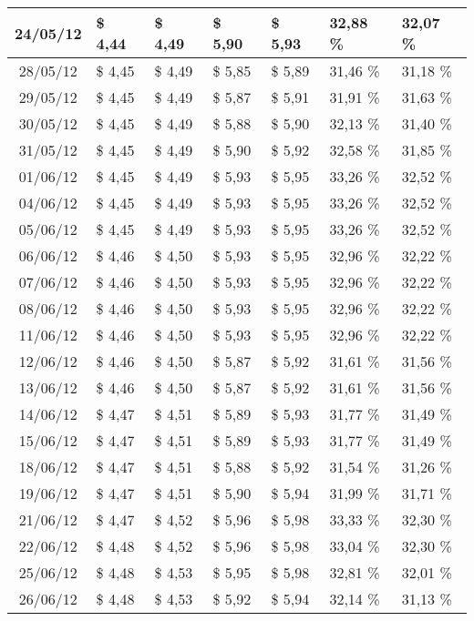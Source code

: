 \begin{center}
\begin{longtable}{|c|p{1.5cm}|p{1.5cm}|p{1.5cm}|p{1.5cm}|p{1.5cm}|p{1.5cm}|}
24/05/12 & \$ 4,44 & \$ 4,49 & \$ 5,90 & \$ 5,93 & 32,88 \% & 32,07 \% \\ \hline
28/05/12 & \$ 4,45 & \$ 4,49 & \$ 5,85 & \$ 5,89 & 31,46 \% & 31,18 \% \\ \hline
29/05/12 & \$ 4,45 & \$ 4,49 & \$ 5,87 & \$ 5,91 & 31,91 \% & 31,63 \% \\ \hline
30/05/12 & \$ 4,45 & \$ 4,49 & \$ 5,88 & \$ 5,90 & 32,13 \% & 31,40 \% \\ \hline
31/05/12 & \$ 4,45 & \$ 4,49 & \$ 5,90 & \$ 5,92 & 32,58 \% & 31,85 \% \\ \hline
01/06/12 & \$ 4,45 & \$ 4,49 & \$ 5,93 & \$ 5,95 & 33,26 \% & 32,52 \% \\ \hline
04/06/12 & \$ 4,45 & \$ 4,49 & \$ 5,93 & \$ 5,95 & 33,26 \% & 32,52 \% \\ \hline
05/06/12 & \$ 4,45 & \$ 4,49 & \$ 5,93 & \$ 5,95 & 33,26 \% & 32,52 \% \\ \hline
06/06/12 & \$ 4,46 & \$ 4,50 & \$ 5,93 & \$ 5,95 & 32,96 \% & 32,22 \% \\ \hline
07/06/12 & \$ 4,46 & \$ 4,50 & \$ 5,93 & \$ 5,95 & 32,96 \% & 32,22 \% \\ \hline
08/06/12 & \$ 4,46 & \$ 4,50 & \$ 5,93 & \$ 5,95 & 32,96 \% & 32,22 \% \\ \hline
11/06/12 & \$ 4,46 & \$ 4,50 & \$ 5,93 & \$ 5,95 & 32,96 \% & 32,22 \% \\ \hline
12/06/12 & \$ 4,46 & \$ 4,50 & \$ 5,87 & \$ 5,92 & 31,61 \% & 31,56 \% \\ \hline
13/06/12 & \$ 4,46 & \$ 4,50 & \$ 5,87 & \$ 5,92 & 31,61 \% & 31,56 \% \\ \hline
14/06/12 & \$ 4,47 & \$ 4,51 & \$ 5,89 & \$ 5,93 & 31,77 \% & 31,49 \% \\ \hline
15/06/12 & \$ 4,47 & \$ 4,51 & \$ 5,89 & \$ 5,93 & 31,77 \% & 31,49 \% \\ \hline
18/06/12 & \$ 4,47 & \$ 4,51 & \$ 5,88 & \$ 5,92 & 31,54 \% & 31,26 \% \\ \hline
19/06/12 & \$ 4,47 & \$ 4,51 & \$ 5,90 & \$ 5,94 & 31,99 \% & 31,71 \% \\ \hline
21/06/12 & \$ 4,47 & \$ 4,52 & \$ 5,96 & \$ 5,98 & 33,33 \% & 32,30 \% \\ \hline
22/06/12 & \$ 4,48 & \$ 4,52 & \$ 5,96 & \$ 5,98 & 33,04 \% & 32,30 \% \\ \hline
25/06/12 & \$ 4,48 & \$ 4,53 & \$ 5,95 & \$ 5,98 & 32,81 \% & 32,01 \% \\ \hline
26/06/12 & \$ 4,48 & \$ 4,53 & \$ 5,92 & \$ 5,94 & 32,14 \% & 31,13 \% \\ \hline

\end{longtable}
\end{center}
